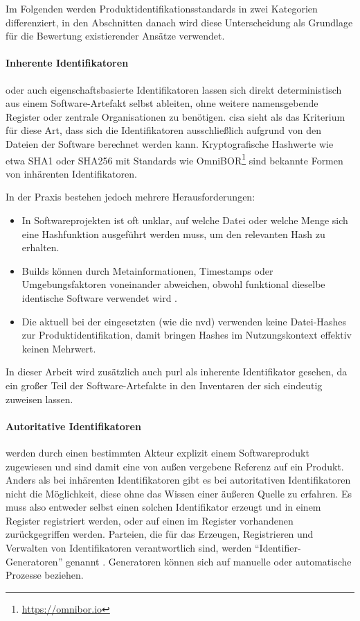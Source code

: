 Im Folgenden werden Produktidentifikationsstandards in zwei Kategorien differenziert, in den Abschnitten danach wird diese Unterscheidung als Grundlage für die Bewertung existierender Ansätze verwendet.

\paragraph{Inherente Identifikatoren} %
oder auch eigenschaftsbasierte Identifikatoren lassen sich direkt deterministisch aus einem Software-Artefakt selbst ableiten, ohne weitere namensgebende Register oder zentrale Organisationen zu benötigen.
\acrshort{cisa} sieht als das Kriterium für diese Art, dass sich die Identifikatoren ausschließlich aufgrund von den Dateien der Software berechnet werden kann.
Kryptografische Hashwerte wie etwa SHA1 oder SHA256 mit Standards wie OmniBOR\footnote{\url{https://omnibor.io}} sind bekannte Formen von inhärenten Identifikatoren.

In der Praxis bestehen jedoch mehrere Herausforderungen:
\begin{itemize}
    \itemsep0em
    \item In Softwareprojekten ist oft unklar, auf welche Datei oder welche Menge sich eine Hashfunktion ausgeführt werden muss, um den relevanten Hash zu erhalten.
    \item Builds können durch Metainformationen, Timestamps oder Umgebungsfaktoren voneinander abweichen, obwohl funktional dieselbe identische Software verwendet wird \autocite{CISA2023}.
    \item Die aktuell bei der \metaeffektsp eingesetzten  (wie die \acrshort{nvd}) verwenden keine Datei-Hashes zur Produktidentifikation, damit bringen Hashes im Nutzungskontext effektiv keinen Mehrwert.
\end{itemize}

In dieser Arbeit wird zusätzlich auch \acrshort{purl} als inherente Identifikator gesehen, da ein großer Teil der Software-Artefakte in den Inventaren der \metaeffektsp sich eindeutig  zuweisen lassen.

\paragraph{Autoritative Identifikatoren}\label{par:authorative-identifiers} %
werden durch einen bestimmten Akteur explizit einem Softwareprodukt zugewiesen und sind damit eine von außen vergebene Referenz auf ein Produkt.
Anders als bei inhärenten Identifikatoren gibt es bei autoritativen Identifikatoren nicht die Möglichkeit, diese ohne das Wissen einer äußeren Quelle zu erfahren.
Es muss also entweder selbst einen solchen Identifikator erzeugt und in einem Register registriert werden, oder auf einen im Register vorhandenen zurückgegriffen werden.
Parteien, die für das Erzeugen, Registrieren und Verwalten von Identifikatoren verantwortlich sind, werden \enquote{Identifier-Generatoren} genannt \autocite{CISA2023}.
Generatoren können sich auf manuelle oder automatische Prozesse beziehen.

